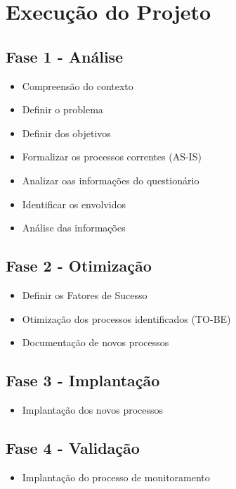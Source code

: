 \section{Execução do Projeto}
\subsection{Fase 1 - Análise}
\begin{itemize}[noitemsep]
	\item Compreensão do contexto
	\item Definir o problema
	\item Definir dos objetivos
	\item Formalizar os processos correntes (AS-IS)
	\item Analizar oas informações do questionário
	\item Identificar os envolvidos
	\item Análise das informações
\end{itemize}
\subsection{Fase 2 - Otimização}
\begin{itemize}[noitemsep]
	\item Definir os Fatores de Sucesso
	\item Otimização dos processos identificados (TO-BE)
	\item Documentação de novos processos
\end{itemize}
\subsection{Fase 3 - Implantação}
\begin{itemize}[noitemsep]
	\item  Implantação dos novos processos
\end{itemize}

\subsection{Fase 4 - Validação}
\begin{itemize}[noitemsep]
	\item Implantação do processo de monitoramento
\end{itemize}
